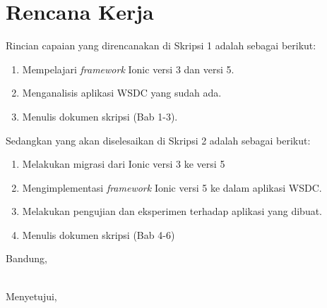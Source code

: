 \documentclass[a4paper,twoside]{article}
\begin{document}
\section{Rencana Kerja}
Rincian capaian yang direncanakan di Skripsi 1 adalah sebagai berikut:
\begin{enumerate}
\item Mempelajari {\it framework} Ionic versi 3 dan versi 5.
\item Menganalisis aplikasi WSDC yang sudah ada.
\item Menulis dokumen skripsi (Bab 1-3).
\end{enumerate}

Sedangkan yang akan diselesaikan di Skripsi 2 adalah sebagai berikut:
\begin{enumerate}
\item Melakukan migrasi dari Ionic versi 3 ke versi 5
\item Mengimplementasi {\it framework} Ionic versi 5 ke dalam aplikasi WSDC. 
\item Melakukan pengujian dan eksperimen terhadap aplikasi yang dibuat.
\item Menulis dokumen skripsi (Bab 4-6)
\end{enumerate}

\newpage

\vspace{1cm}
\centering Bandung, \tanggal\\
\vspace{2cm} \nama \\ 
\vspace{1cm}

Menyetujui, \\
\end{document}
